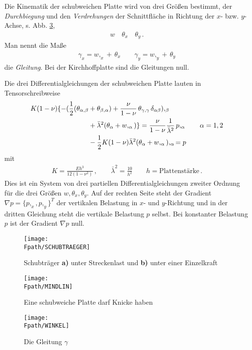Die Kinematik der schubweichen Platte wird von drei Gr\"{o}{\ss}en bestimmt, der {\em Durchbiegung} und den {\em  Verdrehungen} der Schnittfl\"{a}che in Richtung der $x$- bzw. $y$-Achse, s. Abb. \ref{Winkel},
\begin{align}
w \quad \theta_x \quad \theta_y \,.
\end{align}
Man nennt die Ma{\ss}e
\begin{align}
\gamma_x = w,_x + \, \theta_x \qquad \gamma_y = w,_y + \, \theta_y
\end{align}
die {\em Gleitung\/}. Bei der Kirchhoffplatte sind die Gleitungen null.

Die drei Differentialgleichungen der schubweichen Platte lauten in Tensorschreibweise
\begin{align}
K ( 1- \nu) \{ - ( \frac{1}{2} (\theta_{\alpha,\beta} &+ \theta_{\beta,\alpha} )
 + \frac{\nu}{1 - \nu}\, \theta_{\gamma,\gamma} \, \delta_{\alpha \beta} ),_\beta \nonumber \\
&+ \bar{\lambda}^2 (\theta_\alpha + w,_\alpha) \} = \frac{\nu}{1-\nu} \frac{1}{\bar{\lambda}^2}\, p,_\alpha \qquad \alpha = 1,2\\
&- \frac{1}{2} K (1 - \nu) \bar{\lambda}^2 (\theta_\alpha + w,_\alpha),_\alpha = p
\end{align}
mit
\begin{align}
K = \frac{E h^3}{12 (1- \nu^2)} \,,\qquad \bar \lambda^2  = \frac{10}{h^2}\qquad h =
\mbox{Plattenst\"{a}rke}\,.
\end{align}
Dies ist ein System von drei partiellen Differentialgleichungen zweiter Ordnung f\"{u}r die drei Gr\"{o}{\ss}en $w, \theta_x, \theta_y$. Auf der rechten Seite steht der Gradient $\nabla p = \{p,_x, p,_y\}^T$ der vertikalen Belastung in $x$- und $y$-Richtung und in der dritten Gleichung steht die vertikale Belastung $p$ selbst. Bei konstanter Belastung $p$ ist der Gradient $\nabla p$ null.
\begin{figure}[tbp]
\centering
\if {} \sidecaption \fi
\texttt{[image: \\Fpath/SCHUBTRAEGER]}
\caption{Schubtr\"{a}ger {\bf a)} unter Streckenlast und {\bf b)} unter einer Einzelkraft}
\label{Schubtraeger}
\end{figure}%
\begin{figure}[tbp]
\centering
\if {} \sidecaption \fi
\texttt{[image: \\Fpath/MINDLIN]}
\caption{Eine schubweiche Platte darf Knicke haben} \label{Mindlin}
\end{figure}%
\begin{figure}[tbp]
\if {} \sidecaption \fi
\texttt{[image: \\Fpath/WINKEL]}
\caption{Die Gleitung $\gamma$} \label{Winkel}
\end{figure}%


